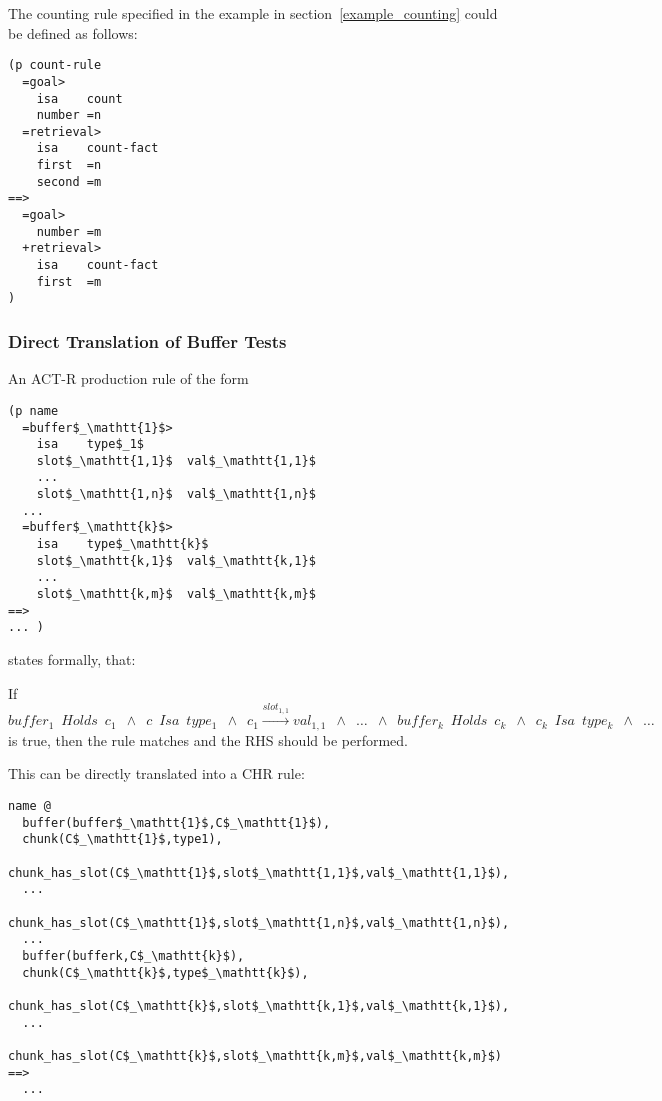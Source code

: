 \begin{example}
\label{ex:counting}
The counting rule specified in the example in section~\ref{example_counting} could be defined as follows:

\begin{lstlisting}
(p count-rule
  =goal> 
    isa    count
    number =n
  =retrieval>
    isa    count-fact
    first  =n
    second =m
==>
  =goal>
    number =m
  +retrieval>
    isa    count-fact
    first  =m
)
\end{lstlisting}


\end{example}

\subsubsection{Direct Translation of Buffer Tests}

An ACT-R production rule of the form

\begin{lstlisting}[mathescape]
(p name
  =buffer$_\mathtt{1}$>
    isa    type$_1$
    slot$_\mathtt{1,1}$  val$_\mathtt{1,1}$
    ...
    slot$_\mathtt{1,n}$  val$_\mathtt{1,n}$
  ...
  =buffer$_\mathtt{k}$>
    isa    type$_\mathtt{k}$
    slot$_\mathtt{k,1}$  val$_\mathtt{k,1}$
    ...
    slot$_\mathtt{k,m}$  val$_\mathtt{k,m}$
==>
... )
\end{lstlisting}

states formally, that:

If $buffer_1 \enspace Holds \enspace c_1 \enspace \wedge \enspace c \enspace Isa \enspace type_1 \enspace \wedge \enspace c_1 \xrightarrow{slot_{1,1}} val_{1,1} \enspace \wedge \enspace \dots \enspace \wedge \enspace buffer_k \enspace Holds \enspace c_k \enspace \wedge \enspace c_k \enspace Isa \enspace type_k \enspace \wedge \enspace \dots$ is true, then the rule matches and the RHS should be performed.

This can be directly translated into a CHR rule:

\begin{lstlisting}[mathescape]
name @
  buffer(buffer$_\mathtt{1}$,C$_\mathtt{1}$),
  chunk(C$_\mathtt{1}$,type1),
  chunk_has_slot(C$_\mathtt{1}$,slot$_\mathtt{1,1}$,val$_\mathtt{1,1}$),
  ...
  chunk_has_slot(C$_\mathtt{1}$,slot$_\mathtt{1,n}$,val$_\mathtt{1,n}$),
  ...
  buffer(bufferk,C$_\mathtt{k}$),
  chunk(C$_\mathtt{k}$,type$_\mathtt{k}$),
  chunk_has_slot(C$_\mathtt{k}$,slot$_\mathtt{k,1}$,val$_\mathtt{k,1}$),
  ...
  chunk_has_slot(C$_\mathtt{k}$,slot$_\mathtt{k,m}$,val$_\mathtt{k,m}$)
==>
  ...
\end{lstlisting}

